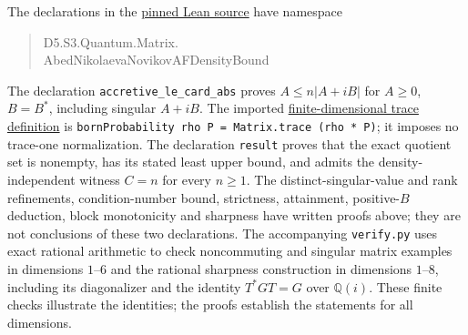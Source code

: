 \documentclass[11pt]{article}
\begin{document}
The declarations in the
\href{https://github.com/the-omega-institute/trureturing/blob/d9bb8a406783c5222849b798f3c2ab738f653d75/D5/S3/Quantum/Matrix/AbedNikolaevaNovikovAFDensityBound.lean}{pinned Lean source}
have namespace
\begin{quote}\small\ttfamily
D5.S3.Quantum.Matrix.\\
AbedNikolaevaNovikovAFDensityBound
\end{quote}
The declaration \texttt{accretive\_le\_card\_abs} proves
$A\leq n|A+iB|$ for $A\geq0$, $B=B^*$, including singular $A+iB$.
The imported
\href{https://github.com/the-omega-institute/trureturing/blob/d9bb8a406783c5222849b798f3c2ab738f653d75/D5/S3/Quantum/FiniteDimensional.lean}{finite-dimensional trace definition}
is \texttt{bornProbability rho P = Matrix.trace (rho * P)};
it imposes no trace-one normalization.
The declaration \texttt{result} proves that the exact quotient set is
nonempty, has its stated least upper bound, and admits the
density-independent witness $C=n$ for every $n\geq1$.
The distinct-singular-value and rank refinements, condition-number bound,
strictness, attainment, positive-$B$ deduction, block monotonicity and
sharpness have written proofs above; they are not conclusions of these
two declarations.
The accompanying \texttt{verify.py} uses exact rational arithmetic to
check noncommuting and singular matrix examples in dimensions $1$--$6$
and the rational sharpness construction in dimensions $1$--$8$,
including its diagonalizer and the identity $T^*GT=G$ over $\mathbb Q(i)$.
These finite checks illustrate the identities; the proofs establish
the statements for all dimensions.
\end{document}

